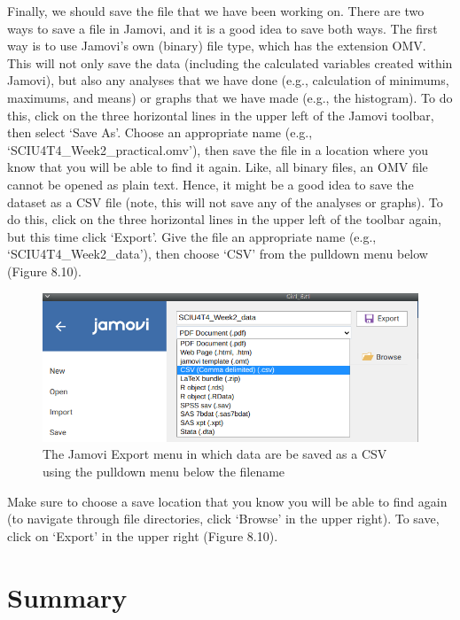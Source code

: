 \documentclass[
]{scrbook}
\begin{document}
Finally, we should save the file that we have been working on.
There are two ways to save a file in Jamovi, and it is a good idea to save both ways.
The first way is to use Jamovi's own (binary) file type, which has the extension OMV.
This will not only save the data (including the calculated variables created within Jamovi), but also any analyses that we have done (e.g., calculation of minimums, maximums, and means) or graphs that we have made (e.g., the histogram).
To do this, click on the three horizontal lines in the upper left of the Jamovi toolbar, then select `Save As'.
Choose an appropriate name (e.g., `SCIU4T4\_Week2\_practical.omv'), then save the file in a location where you know that you will be able to find it again.
Like, all binary files, an OMV file cannot be opened as plain text.
Hence, it might be a good idea to save the dataset as a CSV file (note, this will not save any of the analyses or graphs).
To do this, click on the three horizontal lines in the upper left of the toolbar again, but this time click `Export'.
Give the file an appropriate name (e.g., `SCIU4T4\_Week2\_data'), then choose `CSV' from the pulldown menu below (Figure 8.10).

\begin{figure}
\includegraphics[width=1\linewidth]{img/export_jamovi} \caption{The Jamovi Export menu in which data are be saved as a CSV using the pulldown menu below the filename}\label{fig:unnamed-chunk-34}
\end{figure}

Make sure to choose a save location that you know you will be able to find again (to navigate through file directories, click `Browse' in the upper right).
To save, click on `Export' in the upper right (Figure 8.10).

\hypertarget{summary-1}{%
\section{Summary}\label{summary-1}}
\end{document}
